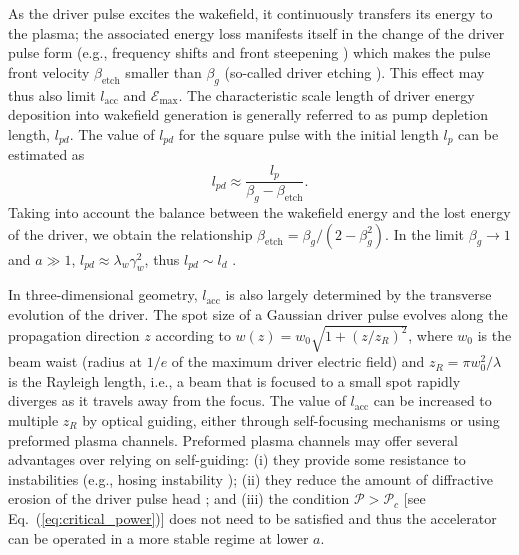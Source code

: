 \documentclass[10pt, a4paper, twoside, openright]{report}
\begin{document}
As the driver pulse excites the wakefield, it continuously transfers its energy to the plasma; the associated energy loss manifests itself in the change of the driver pulse form (e.g., frequency shifts \cite{Esarey1990, Shadwick2009} and front steepening \cite{Bulanov1992, Esarey2000, Gordon2003}) which makes the pulse front velocity $ \beta_{\mathrm{etch}} $ smaller than $ \beta_g $ (so-called driver etching \cite{Nakajima2011}). This effect may thus also limit $ l_{\mathrm{acc}} $ and $ \mathcal{E}_{\mathrm{max}} $. The characteristic scale length of driver energy deposition into wakefield generation is generally referred to as pump depletion length, $ l_{pd} $. The value of $ l_{pd} $ for the square pulse with the initial length $ l_p $ can be estimated as \cite{Bulanov2016}
\begin{equation}\label{key}
	l_{pd} \approx \frac{l_p}{\beta_g - \beta_{\mathrm{etch}}}.
\end{equation}
Taking into account the balance between the wakefield energy and the lost energy of the driver, we obtain the relationship $ \beta_{\mathrm{etch}} = \beta_g / \left( 2 - \beta_g^2 \right) $. In the limit $ \beta_g \rightarrow 1 $ and $ a \gg 1 $, $ l_{pd} \approx \lambda_w \gamma_w^2 $, thus $ l_{pd} \sim l_d $ \cite{Bulanov2016}.

In three-dimensional geometry, $ l_{\mathrm{acc}} $ is also largely determined by the transverse evolution of the driver. The spot size of a Gaussian driver pulse evolves along the propagation direction $ z $ according to $ w \left( z \right) = w_0 \sqrt{1 + \left( z / z_R \right)^2} $, where $ w_0 $ is the beam waist (radius at $ 1 / e $ of the maximum driver electric field) and $ z_R = \pi w_0^2 / \lambda $ is the Rayleigh length, i.e., a beam that is focused to a small spot rapidly diverges as it travels away from the focus. The value of $ l_{\mathrm{acc}} $ can be increased to multiple $ z_{R} $ by optical guiding, either through self-focusing mechanisms or using preformed plasma channels. Preformed plasma channels may offer several advantages over relying on self-guiding: (i) they provide some resistance to instabilities (e.g., hosing instability \cite{Shvets1994, Sprangle1994}); (ii) they reduce the amount of diffractive erosion of the driver pulse head \cite{Sprangle1990, Esarey1997}; and (iii) the condition $ \mathcal{P} > \mathcal{P}_c $ [see Eq.~(\ref{eq:critical_power})] does not need to be satisfied and thus the accelerator can be operated in a more stable regime at lower $ a $.
\end{document}
